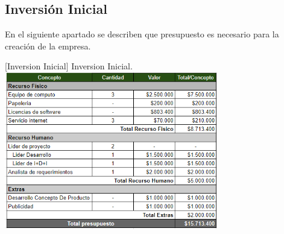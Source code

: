 \subsection{Inversión Inicial}

En el siguiente apartado se describen que presupuesto es necesario para la creación de la empresa.

\vspace{2mm}
\begin{minipage}{0.9\textwidth}
\centering
{}[{Inversion Inicial}]{ Inversion Inicial. }
\label{ingresos}
\includegraphics[width=0.7\textwidth]{Images/inversion inicial.png}
\end{minipage}

